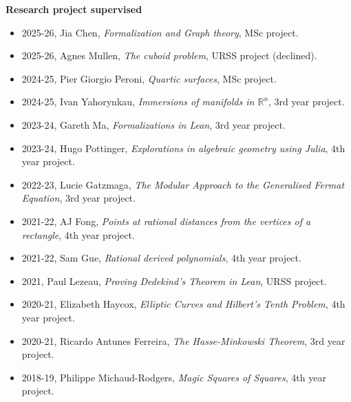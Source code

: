 {\textbf{Research project supervised}}
\begin{itemize}
\vspace{-\smallskipamount}
\item
2025-26, Jia Chen, {\emph{Formalization and Graph theory}}, MSc project.
\vspace{-\smallskipamount}
\item
2025-26, Agnes Mullen, {\emph{The cuboid problem}}, URSS project (declined).
\vspace{-\smallskipamount}
\item
2024-25, Pier Giorgio Peroni, {\emph{Quartic surfaces}}, MSc project.
\vspace{-\smallskipamount}
\item
2024-25, Ivan Yahorynkau, {\emph{Immersions of manifolds in $\mathbb{R}^n$}}, 3rd year project.
\vspace{-\smallskipamount}
\item
2023-24, Gareth Ma, {\emph{Formalizations in Lean}}, 3rd year project.
\vspace{-\smallskipamount}
\item
2023-24, Hugo Pottinger, {\emph{Explorations in algebraic geometry using Julia}}, 4th year project.
\vspace{-\smallskipamount}
\item
2022-23, Lucie Gatzmaga, {\emph{The Modular Approach to the Generalised Fermat Equation}}, 3rd year project.
\vspace{-\smallskipamount}
\item
2021-22, AJ Fong, {\emph{Points at rational distances from the vertices of a rectangle}}, 4th year project.
\vspace{-\smallskipamount}
\item
2021-22, Sam Gue, {\emph{Rational derived polynomials}}, 4th year project.
\vspace{-\smallskipamount}
\item
2021, Paul Lezeau, {\emph{Proving Dedekind's Theorem in Lean}}, URSS project.
\item
2020-21, Elizabeth Haycox, {\emph{Elliptic Curves and Hilbert's Tenth Problem}}, 4th year project.
\vspace{-\smallskipamount}
\item
2020-21, Ricardo Antunes Ferreira, {\emph{The Hasse-Minkowski Theorem}}, 3rd year project.
\vspace{-\smallskipamount}
\item
2018-19, Philippe Michaud-Rodgers, {\emph{Magic Squares of Squares}}, 4th year project.

\end{itemize}
